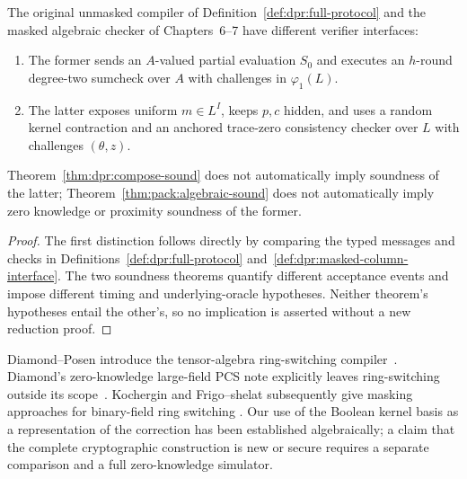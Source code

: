 \begin{proposition}\label{prop:dpr:routes-distinct}
The original unmasked compiler of
Definition~\ref{def:dpr:full-protocol}
and the masked algebraic checker
of Chapters~6--7 have different
verifier interfaces:
\begin{enumerate}[label=\textup{(\roman*)}]
\item The former sends an
$A$-valued partial evaluation
$S_0$ and executes an
$h$-round degree-two
sumcheck over $A$ with
challenges in $\varphi_1(L)$.
\item The latter exposes
uniform $m\in L^I$,
keeps $p,c$ hidden,
and uses a random kernel
contraction and an anchored
trace-zero consistency checker
over $L$ with challenges
$(\theta,z)$.
\end{enumerate}
Theorem~\ref{thm:dpr:compose-sound}
does not automatically imply
soundness of the latter;
Theorem~\ref{thm:pack:algebraic-sound}
does not automatically imply
zero knowledge or proximity
soundness of the former.
\end{proposition}
\begin{proof}
The first distinction follows
directly by comparing the
typed messages and checks in
Definitions~\ref{def:dpr:full-protocol}
and~\ref{def:dpr:masked-column-interface}.
The two soundness theorems
quantify different acceptance
events and impose different
timing and underlying-oracle
hypotheses. Neither theorem's
hypotheses entail the other's,
so no implication is asserted
without a new reduction proof.
\end{proof}

\begin{remark}
Diamond--Posen introduce the
tensor-algebra ring-switching
compiler~\cite{DiamondPosen2024}.
Diamond's zero-knowledge
large-field PCS note explicitly
leaves ring-switching outside
its scope~\cite{Diamond2025ZK}.
Kochergin and Frigo--shelat
subsequently give masking
approaches for binary-field
ring switching
\cite{Kochergin2026,FrigoShelat2026}.
Our use of the Boolean kernel
basis as a representation of the
correction has been established
algebraically; a claim that the
complete cryptographic construction
is new or secure requires a
separate comparison and a full
zero-knowledge simulator.
\end{remark}
